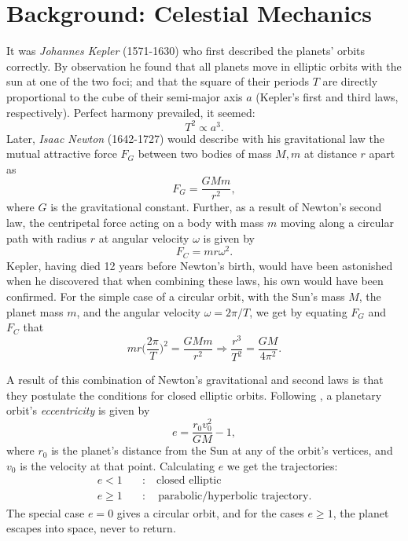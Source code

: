 \documentclass[]{article}
\begin{document}
\section{Background: Celestial Mechanics} \label{celestial-mechanics}
It was \textit{Johannes Kepler} (1571-1630) who first described the planets' orbits correctly. By observation he found that all planets move in elliptic orbits with the sun at one of the two foci; and that the square of their periods $T$ are directly proportional to the cube of their semi-major axis $a$ \cite{hibbeler2001} (Kepler's first and third laws, respectively). Perfect harmony prevailed, it seemed:
\begin{equation}
	T^2 \propto a^3.
\end{equation}
Later, \textit{Isaac Newton} (1642-1727) would describe with his gravitational law the mutual attractive force $F_G$ between two bodies of mass $M, m$ at distance $r$ apart as
\begin{equation} \label{newton-grav}
	F_G = \frac{GMm}{r^2},
\end{equation}
where $G$ is the gravitational constant. Further, as a result of Newton's second law, the centripetal force acting on a body with mass $m$ moving along a circular path with radius $r$ at angular velocity $\omega$ is given by
\begin{equation}
	F_C = mr\omega^2.
\end{equation}
Kepler, having died 12 years before Newton's birth, would have been astonished when he discovered that when combining these laws, his own would have been confirmed. For the simple case of a circular orbit, with the Sun's mass $M$, the planet mass $m$, and the angular velocity $\omega = 2\pi/T$, we get by equating $F_G$ and $F_C$ that
\begin{equation} \label{r3-T2}
	mr\bigg(\frac{2\pi}{T}\bigg)^2 = \frac{GMm}{r^2} \Rightarrow \frac{r^3}{T^2} = \frac{GM}{4\pi^2}.
\end{equation}

A result of this combination of Newton's gravitational and second laws is that they postulate the conditions for closed elliptic orbits. Following \cite{hibbeler2001}, a planetary orbit's \textit{eccentricity} is given by
\begin{equation}
	e = \frac{r_0 v_0^2}{GM} - 1,
\end{equation}
where $r_0$ is the planet's distance from the Sun at any of the orbit's vertices, and $v_0$ is the velocity at that point. Calculating $e$ we get the trajectories:
\begin{equation}
\begin{aligned}
	e < 1 \quad &: \quad \text{closed elliptic} \\
	e \ge 1 \quad &: \quad \text{parabolic/hyperbolic trajectory}.
\end{aligned}
\end{equation}
The special case $e=0$ gives a circular orbit, and for the cases $e \ge 1$, the planet escapes into space, never to return.
\end{document}
